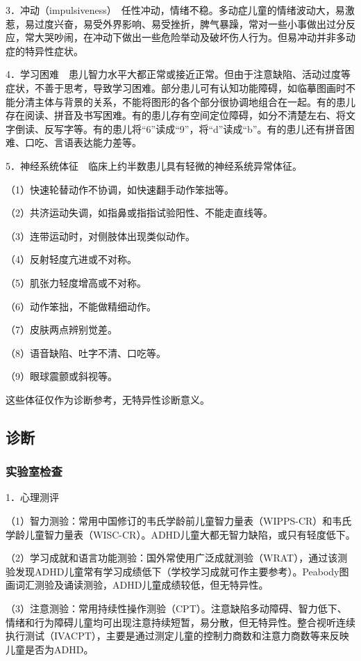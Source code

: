 3．冲动（impulsiveness）　任性冲动，情绪不稳。多动症儿童的情绪波动大，易激惹，易过度兴奋，易受外界影响、易受挫折，脾气暴躁，常对一些小事做出过分反应，常大哭吵闹，在冲动下做出一些危险举动及破坏伤人行为。但易冲动并非多动症的特异性症状。

4．学习困难　患儿智力水平大都正常或接近正常。但由于注意缺陷、活动过度等症状，不善于思考，导致学习困难。部分患儿可有认知功能障碍，如临摹图画时不能分清主体与背景的关系，不能将图形的各个部分很协调地组合在一起。有的患儿存在阅读、拼音及书写困难。有的患儿存有空间定位障碍，如分不清楚左右、将文字倒读、反写字等。有的患儿将“6”读成“9”，将“d”读成“b”。有的患儿还有拼音困难、口吃、言语表达能力差等。

5．神经系统体征　临床上约半数患儿具有轻微的神经系统异常体征。

（1）快速轮替动作不协调，如快速翻手动作笨拙等。

（2）共济运动失调，如指鼻或指指试验阳性、不能走直线等。

（3）连带运动时，对侧肢体出现类似动作。

（4）反射轻度亢进或不对称。

（5）肌张力轻度增高或不对称。

（6）动作笨拙，不能做精细动作。

（7）皮肤两点辨别觉差。

（8）语音缺陷、吐字不清、口吃等。

（9）眼球震颤或斜视等。

这些体征仅作为诊断参考，无特异性诊断意义。

\subsection{诊断}

\subsubsection{实验室检查}

1．心理测评

（1）智力测验：常用中国修订的韦氏学龄前儿童智力量表（WIPPS-CR）和韦氏学龄儿童智力量表（WISC-CR）。ADHD儿童大都无智力缺陷，或只有轻度低下。

（2）学习成就和语言功能测验：国外常使用广泛成就测验（WRAT），通过该测验发现ADHD儿童常有学习成绩低下（学校学习成就可作主要参考）。Peabody图画词汇测验及诵读测验，ADHD儿童成绩较低，但无特异性。

（3）注意测验：常用持续性操作测验（CPT）。注意缺陷多动障碍、智力低下、情绪和行为障碍儿童均可出现注意持续短暂，易分散，但无特异性。整合视听连续执行测试（IVACPT），主要是通过测定儿童的控制力商数和注意力商数等来反映儿童是否为ADHD。

